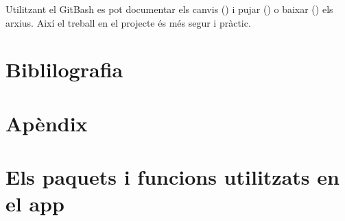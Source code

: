 \documentclass[]{article}
\begin{document}
Utilitzant el GitBash es pot documentar els canvis () i pujar () o baixar () els arxius. Així el treball en el projecte és més segur i pràctic.

\section*{Biblilografia}



\newpage
\section*{Apèndix}
\appendix 
\section{Els paquets i funcions utilitzats en el app}
\label{sec:A1}
\begingroup\fontsize{8}{10}\selectfont
\end{document}
